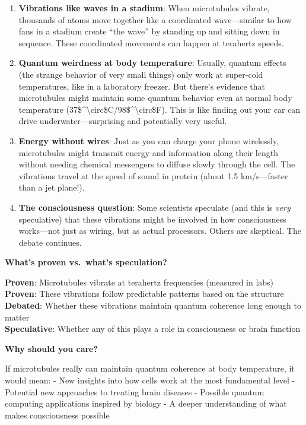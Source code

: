 \begin{enumerate}
\def\labelenumi{\arabic{enumi}.}
\item
  \textbf{Vibrations like waves in a stadium}: When microtubules
  vibrate, thousands of atoms move together like a coordinated
  wave---similar to how fans in a stadium create ``the wave'' by
  standing up and sitting down in sequence. These coordinated movements
  can happen at terahertz speeds.
\item
  \textbf{Quantum weirdness at body temperature}: Usually, quantum
  effects (the strange behavior of very small things) only work at
  super-cold temperatures, like in a laboratory freezer. But
  there's evidence that microtubules might maintain some
  quantum behavior even at normal body temperature
  (37\$\^{}\textbackslash circ\$C/98\$\^{}\textbackslash circ\$F). This
  is like finding out your car can drive underwater---surprising and
  potentially very useful.
\item
  \textbf{Energy without wires}: Just as you can charge your phone
  wirelessly, microtubules might transmit energy and information along
  their length without needing chemical messengers to diffuse slowly
  through the cell. The vibrations travel at the speed of sound in
  protein (about 1.5 km/s---faster than a jet plane!).
\item
  \textbf{The consciousness question}: Some scientists speculate (and
  this is \emph{very} speculative) that these vibrations might be
  involved in how consciousness works---not just as wiring, but as
  actual processors. Others are skeptical. The debate continues.
\end{enumerate}

\textbf{What's proven vs.~what's
speculation?}

\textbf{Proven}: Microtubules vibrate at terahertz frequencies (measured
in labs)\\
\textbf{Proven}: These vibrations follow predictable patterns based on
the structure\\
\textbf{Debated}: Whether these vibrations maintain quantum coherence
long enough to matter\\
\textbf{Speculative}: Whether any of this plays a role in consciousness
or brain function

\textbf{Why should you care?}

If microtubules really can maintain quantum coherence at body
temperature, it would mean: - New insights into how cells work at the
most fundamental level - Potential new approaches to treating brain
diseases - Possible quantum computing applications inspired by biology -
A deeper understanding of what makes consciousness possible

